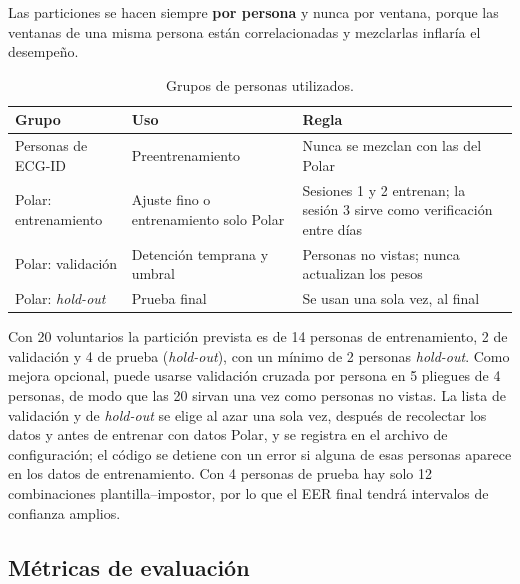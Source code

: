 Las particiones se hacen siempre \textbf{por persona} y nunca por ventana, porque las ventanas de una misma persona están correlacionadas y mezclarlas inflaría el desempeño.

\begin{table}[htbp]
\centering
\caption{Grupos de personas utilizados.}
\label{tab:particion}
\small
\begin{tabularx}{\textwidth}{l X X}
\toprule
\textbf{Grupo} & \textbf{Uso} & \textbf{Regla} \\
\midrule
Personas de ECG-ID & Preentrenamiento & Nunca se mezclan con las del Polar \\
Polar: entrenamiento & Ajuste fino o entrenamiento solo Polar & Sesiones 1 y 2 entrenan; la sesión 3 sirve como verificación entre días \\
Polar: validación & Detención temprana y umbral & Personas no vistas; nunca actualizan los pesos \\
Polar: \emph{hold-out} & Prueba final & Se usan una sola vez, al final \\
\bottomrule
\end{tabularx}
\end{table}

Con 20 voluntarios la partición prevista es de 14 personas de entrenamiento, 2 de validación y 4 de prueba (\emph{hold-out}), con un mínimo de 2 personas \emph{hold-out}. Como mejora opcional, puede usarse validación cruzada por persona en 5 pliegues de 4 personas, de modo que las 20 sirvan una vez como personas no vistas. La lista de validación y de \emph{hold-out} se elige al azar una sola vez, después de recolectar los datos y antes de entrenar con datos Polar, y se registra en el archivo de configuración; el código se detiene con un error si alguna de esas personas aparece en los datos de entrenamiento. Con 4 personas de prueba hay solo 12 combinaciones plantilla--impostor, por lo que el EER final tendrá intervalos de confianza amplios.

\subsection{Métricas de evaluación}

